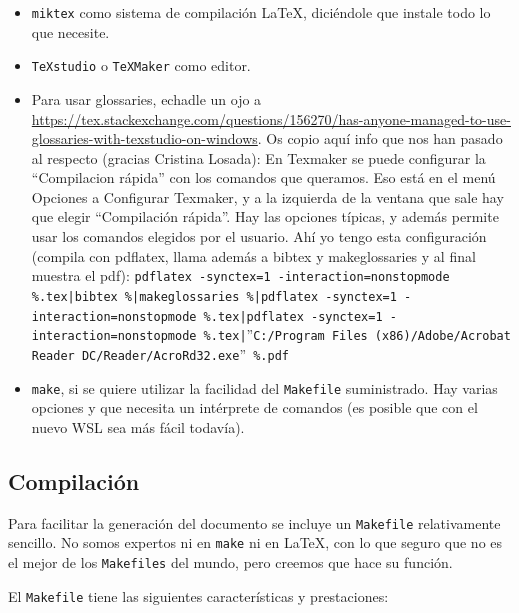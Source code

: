 \documentclass[spanish,openright]{book}
\begin{document}
\begin{itemize}
\begin{itemize}
\item \texttt{miktex} como sistema de compilación \LaTeX{}, diciéndole
que instale todo lo que necesite.
\item \texttt{TeXstudio} o \texttt{TeXMaker} como editor.
\item Para usar glossaries, echadle un ojo a
\url{https://tex.stackexchange.com/questions/156270/has-anyone-managed-to-use-glossaries-with-texstudio-on-windows}. Os
copio aquí info que nos han pasado al respecto (gracias Cristina
Losada): En Texmaker se puede configurar la “Compilacion rápida”
con los comandos que queramos. Eso está en el menú Opciones a
Configurar Texmaker, y a la izquierda de la ventana que sale hay
que elegir “Compilación rápida”. Hay las opciones típicas, y
además permite usar los comandos elegidos por el usuario. Ahí yo
tengo esta configuración (compila con pdflatex, llama además a
bibtex y makeglossaries y al final muestra el pdf):
\texttt{pdflatex -synctex=1 -interaction=nonstopmode \%.tex|bibtex \%|makeglossaries \%|pdflatex -synctex=1 -interaction=nonstopmode \%.tex|pdflatex -synctex=1 -interaction=nonstopmode \%.tex|}''\texttt{C:/Program Files (x86)/Adobe/Acrobat Reader DC/Reader/AcroRd32.exe}''\texttt{ \%.pdf}
\item \texttt{make}, si se quiere utilizar la facilidad del
\texttt{Makefile} suministrado. Hay varias opciones y que necesita
un intérprete de comandos (es posible que con el nuevo WSL sea más
fácil todavía).
\end{itemize}
\end{itemize}

\subsection{Compilación}
\label{sec:compilacion}

Para facilitar la generación del documento se incluye un
\texttt{Makefile} relativamente sencillo. No somos expertos ni en
\texttt{make} ni en \LaTeX, con lo que seguro que no es el mejor de los
\texttt{Makefiles} del mundo, pero creemos que hace su función.

El \texttt{Makefile} tiene las siguientes características y
prestaciones:
\end{document}
